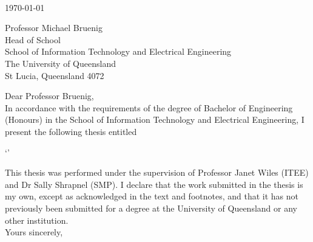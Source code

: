 \begin{flushright}
    \authortext\\
    \href{mailto:\authoremailtext}{\authoremailtext}
\end{flushright}

\vspace{2cm}
\noindent
\today \\\bigskip

\noindent
Professor Michael Bruenig\\
Head of School\\
School of Information Technology and Electrical Engineering\\
The University of Queensland\\
St Lucia, Queensland 4072\\\bigskip

\noindent
Dear Professor Bruenig,\\

In accordance with the requirements of the degree of Bachelor of Engineering (Honours) in the School of Information Technology and Electrical Engineering, I present the following thesis entitled

\begin{center}
`\titletext'
\end{center}

This thesis was performed under the supervision of Professor Janet Wiles (ITEE) and Dr Sally Shrapnel (SMP). I declare that the work submitted in the thesis is my own, except as acknowledged in the text and footnotes, and that it has not previously been submitted for a degree at the University of Queensland or any other institution.\\

\noindent
Yours sincerely,\\\\%

\noindent
\authortext

\clearpage